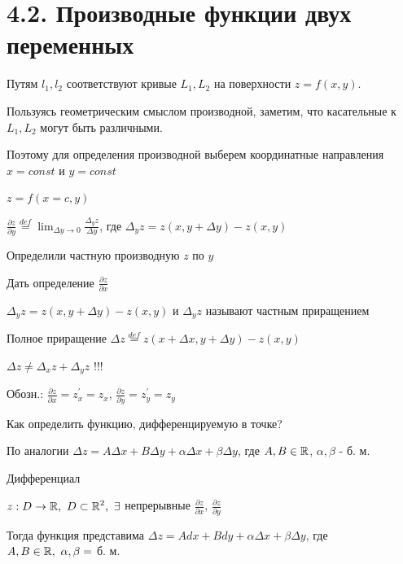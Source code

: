 \documentclass[12pt]{article}
\begin{document}
    \section{4.2. Производные функции двух переменных}

    Путям $l_1, l_2$ соответствуют кривые $L_1, L_2$ на поверхности $z = f(x, y)$.

    Пользуясь геометрическим смыслом производной, заметим, что касательные к $L_1, L_2$ могут быть различными.


    Поэтому для определения производной выберем координатные направления $x = const$ и $y = const$

    $z = f(x = c, y)$

    \hypertarget{partialderivativeoffunctionoftwovariables}{}

    $\displaystyle \frac{\partial z}{\partial y} \stackrel{def}{=} \lim_{\Delta y \to 0} \frac{\Delta_y z}{\Delta y}$,
    где $\Delta_y z = z(x, y + \Delta y) - z(x, y)$

    Определили частную производную $z$ по $y$

    \Lab Дать определение $\displaystyle \frac{\partial z}{\partial x}$

    \Nota $\Delta_y z = z(x, y + \Delta y) - z(x, y)$ и  $\Delta_y z$ называют частным приращением

    \Def Полное приращение $\Delta z \stackrel{def}{=} z(x + \Delta x, y + \Delta y) - z(x, y)$

    \Nota $\Delta z \neq \Delta_x z + \Delta_y z$ !!!

    Обозн.: $\displaystyle \frac{\partial z}{\partial x} = z^\prime_x = z_x$, $\displaystyle \frac{\partial z}{\partial y} = z^\prime_y = z_y$

    Как определить функцию, дифференцируемую в точке?

    По аналогии $\Delta z = A \Delta x + B \Delta y + \alpha \Delta x + \beta \Delta y$, где $A, B \in \mathbb{R}$, $\alpha, \beta$ - б. м.



    Дифференциал

    \Th $\displaystyle z : D \rightarrow \mathbb{R}, \ D \subset \mathbb{R}^2, \ \exists$
    непрерывные $\displaystyle \frac{\partial z}{\partial x}$, $\displaystyle \frac{\partial z}{\partial y}$

    Тогда функция представима $\displaystyle \Delta z = A dx + B dy + \alpha \Delta x + \beta \Delta y$, где $\displaystyle A, B \in \mathbb{R}, \ \alpha, \beta = $ б. м.
\end{document}
